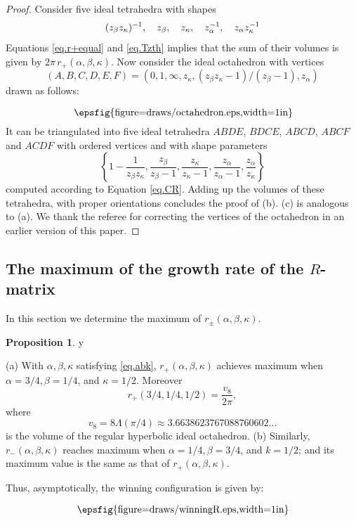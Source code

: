 \documentclass{amsart}
\theoremstyle{definition}
\newtheorem{proposition}[theorem]{Proposition}
\def\printname#1{
    \if\draft y
        \smash{\makebox[0pt]{\hspace{-0.5in}
            \raisebox{8pt}{\tt\tiny #1}}}
    \fi
}
\newcommand{\psdraw}[2]
         {\begin{array}{c} \hspace{-1.3mm}
    \raisebox{-4pt}{\epsfig{figure=draws/#1.eps,width=#2}}
    \hspace{-1.9mm}\end{array}}
\def\lbl#1{\label{#1}\printname{#1}}
\def\a{\alpha}
\def\La{\Lambda}
\def\b{\beta}
\def\k{\kappa}
\begin{document}
\begin{proof}
Consider five ideal tetrahedra with shapes
\begin{equation}
\lbl{eq.5shapes}
(z_{\b}z_{\kappa})^{-1}, \quad z_{\b}, \quad z_{\kappa}, \quad
z_{\a}^{-1}, \quad z_{\a}z_{\kappa}^{-1}
\end{equation}
Equations \eqref{eq.r+equal} and \eqref{eq.Tzth} implies that the sum of
their volumes is given by $2 \pi \, r_+(\a,\b,\kappa)$. Now consider the
ideal octahedron with vertices
$$
(A,B,C,D,E,F)=(0,1,\infty,z_{\kappa},(z_{\b}z_{\kappa}-1)/(z_{\b}-1),z_{\a})
$$
drawn as follows:
$$
\psdraw{octahedron}{1in}
$$
It can be triangulated into five ideal tetrahedra
$ABDE$, $BDCE$, $ABCD$, $ABCF$ and $ACDF$ with ordered vertices and
with shape parameters
$$
\left\{1 - \frac{1}{z_{\b} z_{\kappa}}, \frac{z_{\b}}{z_{\b}-1}, \frac{z_{\kappa}}{z_{\kappa}-1}, \frac{z_{\a}}{z_{\a}-1},
\frac{z_{\a}}{z_{\kappa}} \right\}
$$
computed according to Equation \eqref{eq.CR}. Adding up the volumes
of these tetrahedra, with proper orientations concludes the proof of (b).
(c) is analogous to (a). We thank the referee for correcting the vertices
of the octahedron in an earlier version of this paper.
\end{proof}



\subsection{The maximum of the growth rate of the $R$-matrix}

In this section we determine the maximum of $r_\pm(\a,\b,\k)$.

\begin{proposition}
\lbl{prop.R}
{\rm (a)}
With $\a,\b,\k$ satisfying \eqref{eq.abk}, $r_+(\a,\b,\k)$ achieves
maximum when $\a=3/4, \b=1/4$, and $\k=1/2$. Moreover
$$
r_+(3/4,1/4,1/2)=\frac{v_8}{2 \pi},
$$
where
$$
v_8=8 \La(\pi/4) \approx 3.6638623767088760602 \dots
$$
is the volume of the regular hyperbolic ideal octahedron.
\newline
{\rm (b)}
Similarly,  $r_-(\a,\b,\k)$ reaches maximum when $\a=1/4, \b=3/4$,
and $k=1/2$; and its maximum value is the same as that of
$r_+(\a,\b,\k)$.
\end{proposition}

Thus, asymptotically, the winning configuration is given by:
$$
\psdraw{winningR}{1in}
$$
\end{document}
